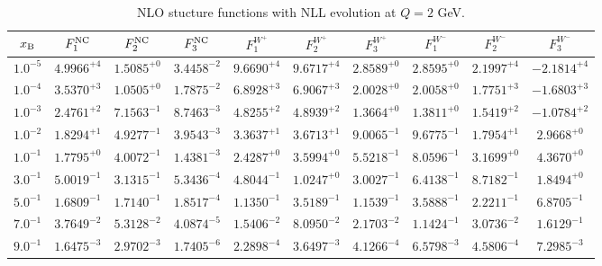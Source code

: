 \begin{table}[h]
\begin{adjustbox}{width=\textwidth}
\begin{tabular}{|c||c|c|c|c|c|c|c|c|c|}
\hline
$x_{\rm B}$ & $F_1^{\rm NC}$ & $F_2^{\rm NC}$ & $F_3^{\rm NC}$ & $F_1^{W^+}$ & $F_2^{W^+}$ & $F_3^{W^+}$ & $F_1^{W^-}$ & $F_2^{W^-}$ & $F_3^{W^-}$ \\
\hline
$ 1.0^{-5}$ & $ 4.9966^{+4}$ & $ 1.5085^{+0}$ & $ 3.4458^{-2}$ & $ 9.6690^{+4}$ & $ 9.6717^{+4}$ & $ 2.8589^{+0}$ & $ 2.8595^{+0}$ & $ 2.1997^{+4}$ & $-2.1814^{+4}$ \\
$ 1.0^{-4}$ & $ 3.5370^{+3}$ & $ 1.0505^{+0}$ & $ 1.7875^{-2}$ & $ 6.8928^{+3}$ & $ 6.9067^{+3}$ & $ 2.0028^{+0}$ & $ 2.0058^{+0}$ & $ 1.7751^{+3}$ & $-1.6803^{+3}$ \\
$ 1.0^{-3}$ & $ 2.4761^{+2}$ & $ 7.1563^{-1}$ & $ 8.7463^{-3}$ & $ 4.8255^{+2}$ & $ 4.8939^{+2}$ & $ 1.3664^{+0}$ & $ 1.3811^{+0}$ & $ 1.5419^{+2}$ & $-1.0784^{+2}$ \\
$ 1.0^{-2}$ & $ 1.8294^{+1}$ & $ 4.9277^{-1}$ & $ 3.9543^{-3}$ & $ 3.3637^{+1}$ & $ 3.6713^{+1}$ & $ 9.0065^{-1}$ & $ 9.6775^{-1}$ & $ 1.7954^{+1}$ & $ 2.9668^{+0}$ \\
$ 1.0^{-1}$ & $ 1.7795^{+0}$ & $ 4.0072^{-1}$ & $ 1.4381^{-3}$ & $ 2.4287^{+0}$ & $ 3.5994^{+0}$ & $ 5.5218^{-1}$ & $ 8.0596^{-1}$ & $ 3.1699^{+0}$ & $ 4.3670^{+0}$ \\
$ 3.0^{-1}$ & $ 5.0019^{-1}$ & $ 3.1315^{-1}$ & $ 5.3436^{-4}$ & $ 4.8044^{-1}$ & $ 1.0247^{+0}$ & $ 3.0027^{-1}$ & $ 6.4138^{-1}$ & $ 8.7182^{-1}$ & $ 1.8494^{+0}$ \\
$ 5.0^{-1}$ & $ 1.6809^{-1}$ & $ 1.7140^{-1}$ & $ 1.8517^{-4}$ & $ 1.1350^{-1}$ & $ 3.5189^{-1}$ & $ 1.1539^{-1}$ & $ 3.5888^{-1}$ & $ 2.2211^{-1}$ & $ 6.8705^{-1}$ \\
$ 7.0^{-1}$ & $ 3.7649^{-2}$ & $ 5.3128^{-2}$ & $ 4.0874^{-5}$ & $ 1.5406^{-2}$ & $ 8.0950^{-2}$ & $ 2.1703^{-2}$ & $ 1.1424^{-1}$ & $ 3.0736^{-2}$ & $ 1.6129^{-1}$ \\
$ 9.0^{-1}$ & $ 1.6475^{-3}$ & $ 2.9702^{-3}$ & $ 1.7405^{-6}$ & $ 2.2898^{-4}$ & $ 3.6497^{-3}$ & $ 4.1266^{-4}$ & $ 6.5798^{-3}$ & $ 4.5806^{-4}$ & $ 7.2985^{-3}$ \\
\hline
\end{tabular}
\end{adjustbox}\caption{NLO stucture functions with NLL evolution at $Q = 2$ GeV.}
\label{tab:N1LO-Q2}
\end{table}


